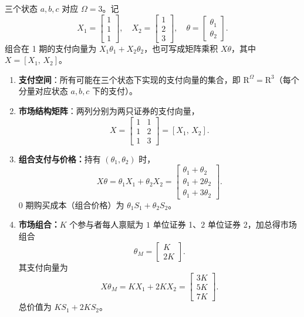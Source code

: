 \begin{solution}
三个状态 $a,b,c$ 对应 $\Omega=3$。记
\[
    X_1=\begin{bmatrix}1 \\ 1 \\ 1\end{bmatrix},\quad
    X_2=\begin{bmatrix}1 \\ 2 \\ 3\end{bmatrix},\quad
    \theta=\begin{bmatrix}\theta_1 \\ \theta_2\end{bmatrix}.
\]
组合在 1 期的支付向量为 $X_1\theta_1+X_2\theta_2$，也可写成矩阵乘积 $X\theta$，其中 $X=[X_1,\,X_2]$。

\begin{enumerate}[label=(\alph*)]
    \item \textbf{支付空间}：所有可能在三个状态下实现的支付向量的集合，即 $\mathrm{R}^{\Omega}=\mathrm{R}^{3}$（每个分量对应状态 $a,b,c$ 下的支付）。

    \item \textbf{市场结构矩阵}：两列分别为两只证券的支付向量，
    \[
        X=\begin{bmatrix}1&1\\1&2\\1&3\end{bmatrix}=[X_1,\,X_2].
    \]

    \item \textbf{组合支付与价格：}持有 $(\theta_1,\theta_2)$ 时，
    \[
        X\theta=\theta_1 X_1+\theta_2 X_2=
        \begin{bmatrix}\theta_1+\theta_2 \\ \theta_1+2\theta_2 \\ \theta_1+3\theta_2\end{bmatrix}.
    \]
    0 期购买成本（组合价格）为 $\theta_1 S_1+\theta_2 S_2$。

    \item \textbf{市场组合：}$K$ 个参与者每人禀赋为 $1$ 单位证券 1、$2$ 单位证券 2，加总得市场组合
    \[
        \theta_M=\begin{bmatrix}K \\ 2K\end{bmatrix}.
    \]
    其支付向量为
    \[
        X\theta_M=K X_1+2K X_2=
        \begin{bmatrix}3K \\ 5K \\ 7K\end{bmatrix}.
    \]
    总价值为 $K S_1+2K S_2$。


\end{enumerate}
\end{solution}
